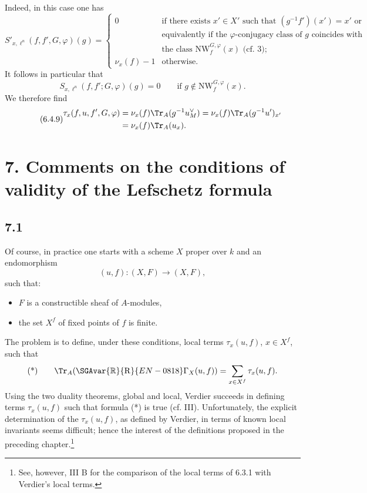Indeed, in this case one has
\begin{equation}\tag{6.4.7}
S'_{x,\ell^n}(f,f',G,\varphi)(g)=
\begin{cases}
0&\text{if there exists }x'\in X'\text{ such that }(g^{-1}f')(x')=x'\text{ or}\\
&\text{equivalently if the $\varphi$-conjugacy class of $g$ coincides with}\\
&\text{the class }\mathrm{NW}_{f}^{G,\varphi}(x)\text{ (cf. 3); }\\
\nu_x(f)-1&\text{otherwise.}
\end{cases}
\end{equation}
It follows in particular that
\begin{equation}\tag{6.4.8}
S_{x,\ell^n}(f,f';G,\varphi)(g)=0
\qquad \text{if } g\notin \mathrm{NW}_{f}^{G,\varphi}(x).
\end{equation}
We therefore find
\begin{equation}\tag{6.4.9}
\begin{aligned}
\tau_x(f,u,f',G,\varphi)
&=\nu_x(f)\Tr_A(g^{-1}u_M^\vee)
=\nu_x(f)\Tr_A(g^{-1}u')_{x'}\\
&=\nu_x(f)\Tr_A(u_x).
\end{aligned}
\end{equation}

\section*{7. Comments on the conditions of validity of the Lefschetz formula}

\subsection*{7.1}
Of course, in practice one starts with a scheme $X$ proper over $k$ and an endomorphism
\[
(u,f):(X,F)\longrightarrow (X,F),
\]
such that:
\begin{itemize}
\item $F$ is a constructible sheaf of $A$-modules,
\item the set $X^f$ of fixed points of $f$ is finite.
\end{itemize}
The problem is to define, under these conditions, local terms $\tau_x(u,f)$, $x\in X^f$, such that
\[
\text{(*)}\qquad \Tr_A(\SGAvar{\mathbb{R}}{\mathrm{R}}{EN-0818}\Gamma_X(u,f))=\sum_{x\in X^f}\tau_x(u,f).
\]
Using the two duality theorems, global and local, Verdier succeeds in defining terms $\tau_x(u,f)$ such that formula (*) is true (cf. III). Unfortunately, the explicit determination of the $\tau_x(u,f)$, as defined by Verdier, in terms of known local invariants seems difficult; hence the interest of the definitions proposed in the preceding chapter.\footnote{See, however, III B for the comparison of the local terms of 6.3.1 with Verdier's local terms.}

